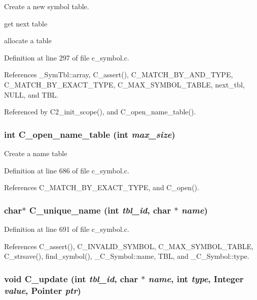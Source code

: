 Create a new symbol table. 

get next table

allocate a table 

Definition at line 297 of file c\_\-symbol.c.

References \_\-Sym\-Tbl::array, C\_\-assert(), C\_\-MATCH\_\-BY\_\-AND\_\-TYPE, C\_\-MATCH\_\-BY\_\-EXACT\_\-TYPE, C\_\-MAX\_\-SYMBOL\_\-TABLE, next\_\-tbl, NULL, and TBL.

Referenced by C2\_\-init\_\-scope(), and C\_\-open\_\-name\_\-table().
\subsubsection{\setlength{\rightskip}{0pt plus 5cm}int C\_\-open\_\-name\_\-table (int {\em max\_\-size})}\label{c__symbol_8h_72acbcb8e0206c293a730449e97a2e9e}


Create a name table 

Definition at line 686 of file c\_\-symbol.c.

References C\_\-MATCH\_\-BY\_\-EXACT\_\-TYPE, and C\_\-open().
\subsubsection{\setlength{\rightskip}{0pt plus 5cm}char$\ast$ C\_\-unique\_\-name (int {\em tbl\_\-id}, char $\ast$ {\em name})}\label{c__symbol_8h_040c25b4616d473be8eff35b29ea1982}




Definition at line 691 of file c\_\-symbol.c.

References C\_\-assert(), C\_\-INVALID\_\-SYMBOL, C\_\-MAX\_\-SYMBOL\_\-TABLE, C\_\-strsave(), find\_\-symbol(), \_\-C\_\-Symbol::name, TBL, and \_\-C\_\-Symbol::type.
\subsubsection{\setlength{\rightskip}{0pt plus 5cm}void C\_\-update (int {\em tbl\_\-id}, char $\ast$ {\em name}, int {\em type}, \bf{Integer} {\em value}, \bf{Pointer} {\em ptr})}\label{c__symbol_8h_13838f31c0fd9fb771ca279c949b65dd}


